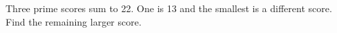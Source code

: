 Three prime scores sum to 22. One is 13 and the smallest is a different score. Find the remaining larger score.
